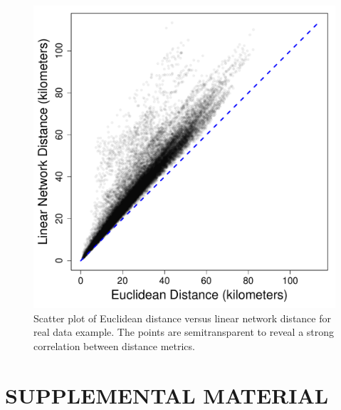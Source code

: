 \documentclass[11pt, titlepage]{article}\usepackage[]{graphicx}\usepackage[]{color}
\renewcommand{\theequation}{eqn \arabic{equation}}
\begin{document}
\begin{spacing}{1.9}
\begin{flushleft}
\begin{singlespace}
	\begin{figure}[H]
	  \begin{center}
	    \includegraphics[width=.7\linewidth]{figure/Fig-EucLinScatter-1.pdf}
	  \end{center}
	  \caption{Scatter plot of Euclidean distance versus linear network distance for real data example.  The points are semitransparent to reveal a strong correlation between distance metrics.   \label{fig:EucLinScatter}}
  \end{figure}


\end{singlespace}
\end{flushleft}



\clearpage
\setcounter{equation}{0}
\renewcommand{\theequation}{eqn S.\arabic{equation}}
\setcounter{figure}{0}
\renewcommand{\thefigure}{S\arabic{figure}}
\section*{SUPPLEMENTAL MATERIAL}


\end{spacing}
\end{document}
